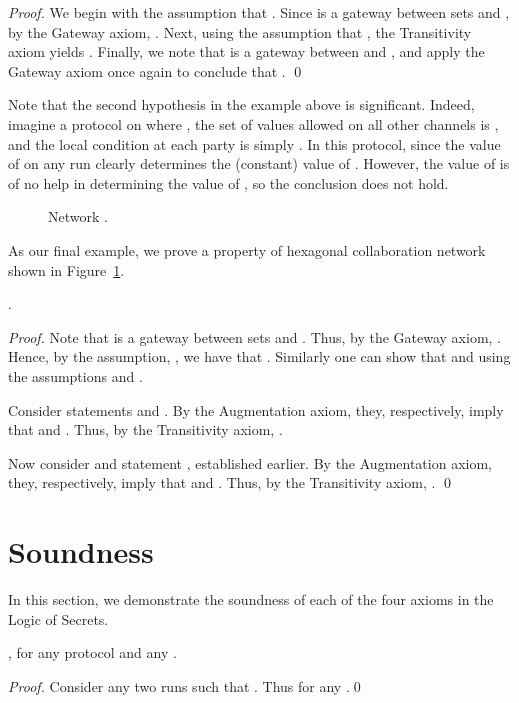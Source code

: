 \documentclass{llncs}
\newcommand{\gateway}{Gateway }
\begin{document}
\begin{proof}
We begin with the assumption that .  Since  is a gateway between sets  and , by the \gateway axiom, .  Next, using the assumption that , the Transitivity axiom yields .  Finally, we note that  is a gateway between  and , and apply the \gateway axiom once again to conclude that .
\qed \end{proof}

Note that the second hypothesis in the example above is significant.  Indeed, imagine a protocol on  where , the set of values allowed on all other channels is , and the local condition at each party  is simply .  In this protocol,  since the value of  on any run clearly determines the (constant) value of .   However, the value of  is of no help in determining the value of , so the conclusion  does not hold.

\begin{figure}[htbp]
\begin{center}
\caption{Network .}
\label{benzene_graph}
\end{center}
\end{figure}
As our final example, we prove a property of hexagonal collaboration network  shown in Figure~\ref{benzene_graph}.

\begin{proposition}\label{}
.
\end{proposition}
\begin{proof}
Note that  is a gateway between sets  and . Thus, by the Gateway axiom,
. Hence, by the assumption, , we have that . Similarly one
can show that  and  using the assumptions  and .

Consider statements  and . By the Augmentation axiom, they, respectively, imply that
 and . Thus, by the Transitivity axiom, .

Now consider  and statement , established earlier.
By the Augmentation axiom, they, respectively, imply that
 and . Thus, by the Transitivity axiom, 
.
\qed
\end{proof}





\section{Soundness}\label{sec:sound}
In this section, we demonstrate the soundness of each of the four axioms in the Logic of Secrets.

\begin{theorem}[Reflexivity]\label{}
, for any protocol  and any .
\end{theorem}
\begin{proof}
Consider any two runs  such that . Thus  for any .\qed
\end{proof}
\end{document}
